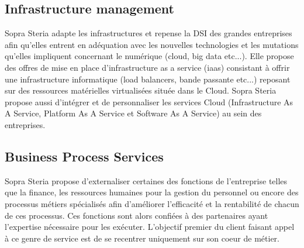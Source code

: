 \subsection{Infrastructure management}
Sopra Steria adapte les infrastructures et repense la DSI des grandes entreprises afin qu'elles entrent en adéquation avec les nouvelles technologies et les mutations qu'elles impliquent concernant le numérique (cloud, big data etc...). Elle propose des offres de mise en place d'infrastructure as a service (iaas) consistant à offrir une infrastructure informatique (load balancers, bande passante etc...) reposant sur des ressources matérielles virtualisées située dans le Cloud. Sopra Steria propose aussi d'intégrer et de personnaliser les services Cloud (Infrastructure As A Service, Platform As A Service et Software As A Service) au sein des entreprises.

\subsection{Business Process Services}
Sopra Steria propose d'externaliser certaines des fonctions de l'entreprise telles que la finance, les ressources humaines pour la gestion du personnel ou encore des processus métiers spécialisés afin d'améliorer l'efficacité et la rentabilité de chacun de ces processus. Ces fonctions sont alors confiées à des partenaires ayant l'expertise nécessaire pour les exécuter. L'objectif premier du client faisant appel à ce genre de service est de se recentrer uniquement sur son coeur de métier.

